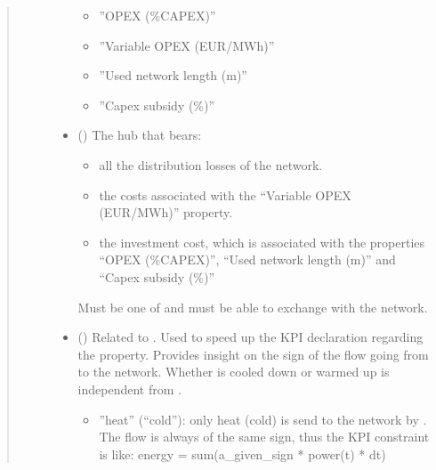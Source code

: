 \documentclass[letterpaper,10pt,english]{sphinxmanual}
\begin{document}
\begin{fulllineitems}
\begin{fulllineitems}
\begin{quote}
\begin{description}
\begin{itemize}
\begin{itemize}
\item {} 
\sphinxAtStartPar
”OPEX (\%CAPEX)”

\item {} 
\sphinxAtStartPar
”Variable OPEX (EUR/MWh)”

\item {} 
\sphinxAtStartPar
”Used network length (m)”

\item {} 
\sphinxAtStartPar
”Capex subsidy (\%)”

\end{itemize}


\item {} 
\sphinxAtStartPar
{} ({\hyperref[\detokenize{generated/tamos.Hub:tamos.Hub}]{}}) \textendash{} 
\sphinxAtStartPar
The hub that bears:
\begin{itemize}
\item {} 
\sphinxAtStartPar
all the distribution losses of the network.

\item {} 
\sphinxAtStartPar
the costs associated with the “Variable OPEX (EUR/MWh)” property.

\item {} 
\sphinxAtStartPar
the investment cost, which is associated with the properties
“OPEX (\%CAPEX)”, “Used network length (m)” and “Capex subsidy (\%)”

\end{itemize}

\sphinxAtStartPar
Must be one of  and must be able to exchange  with the network.


\item {} 
\sphinxAtStartPar
{} (\sphinxstyleliteralemphasis{\sphinxupquote{, }}\sphinxstyleliteralemphasis{\sphinxupquote{, }}\sphinxstyleliteralemphasis{\sphinxupquote{, }}\sphinxstyleliteralemphasis{\sphinxupquote{, }}) \textendash{} 
\sphinxAtStartPar
Related to .
Used to speed up the KPI declaration regarding the  property.
Provides insight on the sign of the flow going from  to the network.
Whether  is cooled down or warmed up is independent from .
\begin{itemize}
\item {} 
\sphinxAtStartPar
”heat” (“cold”): only heat (cold) is send to the network by .
The flow is always of the same sign, thus the KPI constraint is like:
energy = sum(a\_given\_sign * power(t) * dt)


\end{itemize}
\end{itemize}
\end{description}
\end{quote}
\end{fulllineitems}
\end{fulllineitems}
\end{document}
